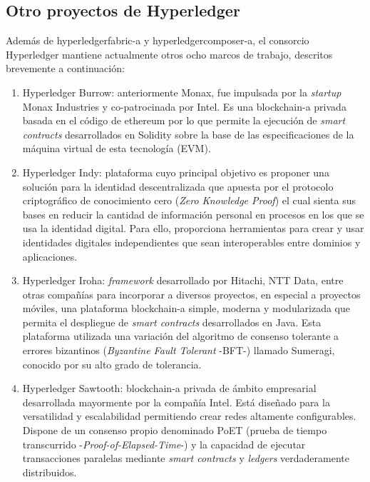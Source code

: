 \documentclass[12pt,a4paper, twoside]{report}
\begin{document}
	\subsection{Otro proyectos de Hyperledger}

	Además de \gls{hyperledgerfabric-a} y \gls{hyperledgercomposer-a}, el consorcio Hyperledger mantiene actualmente otros ocho marcos de trabajo, descritos brevemente a continuación:
	
	\begin{enumerate}
		\item Hyperledger Burrow: anteriormente Monax, fue impulsada por la \textit{startup} Monax Industries y co-patrocinada por Intel. Es una \gls{blockchain-a} privada basada en el código de \gls{ethereum} por lo que permite la ejecución de \textit{smart contracts} desarrollados en Solidity sobre la base de las especificaciones de la máquina virtual de esta tecnología (EVM).
				
		\item Hyperledger Indy: plataforma cuyo principal objetivo es proponer una solución para la identidad descentralizada que apuesta por el protocolo criptográfico de conocimiento cero (\textit{Zero Knowledge Proof}) el cual sienta sus bases en reducir la cantidad de información personal en procesos en los que se usa la identidad digital. Para ello, proporciona herramientas para crear y usar identidades digitales independientes que sean interoperables entre dominios y aplicaciones.
		
		\item Hyperledger Iroha: \textit{\gls{framework}} desarrollado por Hitachi, NTT Data, entre otras compañías para incorporar a diversos proyectos, en especial a proyectos móviles, una plataforma \gls{blockchain-a} simple, moderna y modularizada que permita el despliegue de \textit{smart contracts} desarrollados en Java. Esta plataforma utilizada una variación del algoritmo de consenso tolerante a errores bizantinos (\textit{Byzantine Fault Tolerant} -BFT-) llamado Sumeragi, conocido por su alto grado de tolerancia.
				 
		\item Hyperledger Sawtooth: \gls{blockchain-a} privada de ámbito empresarial desarrollada mayormente por la compañía Intel. Está diseñado para la versatilidad y escalabilidad permitiendo crear redes altamente configurables. Dispone de un consenso propio denominado PoET (prueba de tiempo transcurrido -\textit{Proof-of-Elapsed-Time}-) y la capacidad de ejecutar transacciones paralelas mediante \textit{smart contracts} y \textit{ledgers} verdaderamente distribuidos.
		

\end{enumerate}
\end{document}
